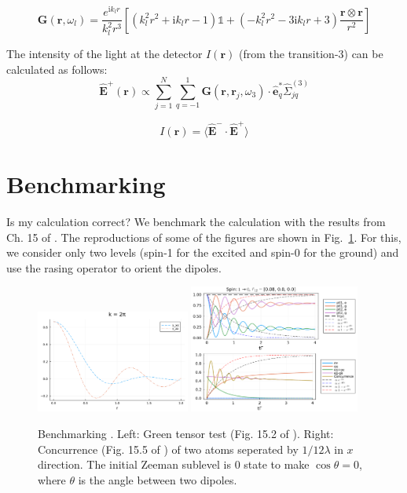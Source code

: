 \documentclass{article}
\begin{document}
$$
\mathbf{G}\left(\mathbf{r}, \omega_l\right)=\frac{e^{\mathrm{i} k_l r}}{k_l^2 r^3}\left[\left(k_l^2 r^2+\mathrm{i} k_l r-1\right) \mathbb{1} +\left(-k_l^2 r^2-3 \mathrm{i} k_l r+3\right) \frac{\mathbf{r} \otimes \mathbf{r}}{r^2}\right]
$$

The intensity of the light at the detector $I(\mathbf{r})$ (from the transition-3) can be calculated as follows:
$$
\hat{\mathbf{E}}^{+}(\mathbf{r}) \propto \sum_{j=1}^N \sum_{q=-1}^1 \mathbf{G}\left(\mathbf{r}, \mathbf{r}_j, \omega_3\right) \cdot \hat{\mathbf{e}}_q^* \hat{\Sigma}_{j q}^{(3)}
$$

$$
I(\mathbf{r}) = \langle  \hat{\mathbf{E}}^{-} \cdot \hat{\mathbf{E}}^{+}\rangle 
$$

\section{Benchmarking}
Is my calculation correct? We benchmark the calculation with the results from Ch. 15 of \cite{agarwalQuantumOptics2012}. The reproductions of some of the figures are shown in Fig.~\ref{fig:benchmark}. For this, we consider only two levels (spin-1 for the excited and spin-0 for the ground) and use the rasing operator to orient the dipoles. 

\begin{figure}
    \includegraphics[width=0.45\textwidth]{GreenTensor_test.pdf}
    \includegraphics[width=0.5\textwidth]{Concurrence.pdf}
    \caption{Benchmarking \cite{agarwalQuantumOptics2012}. Left: Green tensor test (Fig. 15.2 of \cite{agarwalQuantumOptics2012}). Right: Concurrence (Fig. 15.5 of \cite{agarwalQuantumOptics2012}) of two atoms seperated by $1/12 \lambda$ in $x$ direction. The initial Zeeman sublevel is 0 state to make $\cos{\theta} = 0$, where $\theta$ is the angle between two dipoles. \label{fig:benchmark}} 
\end{figure}
\end{document}
